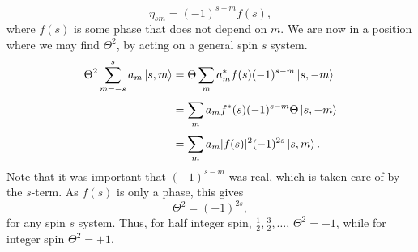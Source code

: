 \begin{equation}
  \eta _{sm} = (-1)^{s-m} f(s),
\end{equation}
where  $f(s)$  is some phase that does not depend on $m$.
We are now in a position where we may find $\Theta ^2$, by acting on a general spin $s$ system.
\begin{align}
  \Theta ^2 \sum\limits_{m = -s}^s a_m \ket{s, m} &= \Theta  \sum\limits_m^{} a^{*}_m f(s) (-1)^{s-m} \ket{s, -m}\\
                                                  &= \sum\limits_m^{} a_m f^{*}(s) (-1)^{s-m} \Theta \ket{s, -m}\\
  &= \sum\limits_m^{} a_m |f(s)|^2 (-1)^{2s} \ket{s, m}.
\end{align}
Note that it was important that $(-1)^{s-m}$ was real, which is taken care of by the $s$-term.
As $f(s)$ is only a phase, this gives
\begin{equation}
  \Theta ^2 = (-1)^{2s},
\end{equation}
for any spin $s$ system.
Thus, for half integer spin, $\frac{1}{2}, \frac{3}{2}, \dots $, $\Theta ^2 = -1$, while for integer spin $\Theta ^2= +1$.


\begin{comment}
  We implement this by letting the time-reversal operator be a $\pi $ rotation of the spin, around some axis.
  Following the convention of considering this as a rotation around the $y$-axis, the $\Theta = UK$ operator gets the form~\cite{bernevigTopologicalInsulatorsTopological2013}
  $$
  \Theta = \eta e^{-i\pi S_y} K,
  $$
  where $\eta$ is some arbitrary phase and $S_y$ is the spin operator in the $y$-direction.
  Also, $\hbar = 1$ for ease of notation.
  Taylor expanding the exponential, splitting the terms into the $\sin$ and $\cos$ terms, and noting that
  \todo{TODO write something more legit here.}
  $$
  S_y^2 = \frac{1}{2}
  $$
  we can simplify the expression for $\Theta$.
  \begin{equation}
    \Theta = - i \eta \left(2 S_y\right) K.
  \end{equation}
  Thus, one gets
  \begin{equation}
    \Theta^2 =
    4 i \eta^2 S_y K i  S_y K =
    4 i \eta^2 S_y (-i S_y^*) =
    4 i \eta^2 S_y S_y^* =
    -4 i \eta^2 S_y^2.
  \end{equation}
\end{comment}
